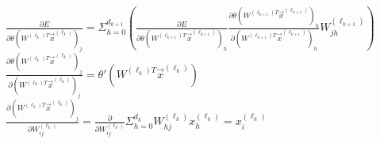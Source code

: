 \documentclass[10pt]{article}
\begin{document}
\noindent
$\frac{\partial E}{\partial \theta(W^{(\ell_k)T}\vec{x}^{(\ell_k)})_j} =
    \Sigma_{h=0}^{d_{k+1}}\left(
        \frac{\partial E}{\partial\theta(W^{(\ell_{k+1})T}\vec{x}^{(\ell_{k+1})})_h}
        \frac{\partial\theta(W^{(\ell_{k+1})T}\vec{x}^{(\ell_{k+1})})_h}{\partial(W^{(\ell_{k+1})T}\vec{x}^{(\ell_{k+1})})_h}
        W_{jh}^{(\ell_{k+1})}
    \right)
$\\

\noindent
$\frac{\partial \theta(W^{(\ell_k)T}\vec{x}^{(\ell_k)})_j}{\partial (W^{(\ell_k)T}\vec{x}^{(\ell_k)})_j} =
    \theta'(W^{(\ell_k)T}\vec{x}^{(\ell_k)})$\\

\noindent
$\frac{\partial (W^{(\ell_k)T}\vec{x}^{(\ell_k)})_j}{\partial W_{ij}^{(\ell_k)}} =
    \frac\partial{\partial W_{ij}^{(\ell_k)}}\Sigma_{h=0}^{d_k}W_{hj}^{(\ell_k)}x_h^{(\ell_k)} = x_i^{(\ell_k)}$\\
\end{document}
